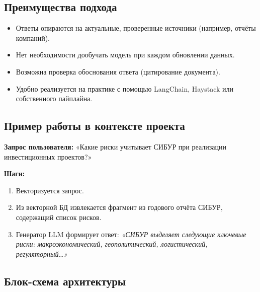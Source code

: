 \documentclass[12pt]{article}
\begin{document}
\subsection{Преимущества подхода}

\begin{itemize}
    \item Ответы опираются на актуальные, проверенные источники (например, отчёты компаний).
    \item Нет необходимости дообучать модель при каждом обновлении данных.
    \item Возможна проверка обоснования ответа (цитирование документа).
    \item Удобно реализуется на практике с помощью LangChain, Haystack или собственного пайплайна.
\end{itemize}

\subsection{Пример работы в контексте проекта}

\textbf{Запрос пользователя:}  
«Какие риски учитывает СИБУР при реализации инвестиционных проектов?»

\textbf{Шаги:}
\begin{enumerate}
    \item Векторизуется запрос.
    \item Из векторной БД извлекается фрагмент из годового отчёта СИБУР, содержащий список рисков.
    \item Генератор LLM формирует ответ:  
    \textit{«СИБУР выделяет следующие ключевые риски: макроэкономический, геополитический, логистический, регуляторный…»}
\end{enumerate}

\subsection{Блок-схема архитектуры}
\end{document}
